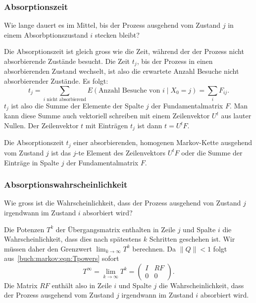 \subsubsection{Absorptionszeit}
%
\begin{frage}
Wie lange dauert es im Mittel, bis der Prozess ausgehend vom Zustand $j$
in einem Absorbptionszustand $i$ stecken bleibt?
\end{frage}
Die Absorptionszeit ist gleich gross wie die Zeit,
während der der Prozess nicht absorbierende
Zustände besucht.
Die Zeit $t_j$, bis der Prozess in einen absorbierenden Zustand wechselt, ist also
die erwartete Anzahl Besuche nicht absorbierender Zustände.
Es folgt:
\[
t_j
=
\sum_{\text{$i$ nicht absorbierend}} E(\text{Anzahl Besuche von $i$}\mid X_0=j)
=
\sum_{i} F_{i\!j}.
\]
$t_j$ ist also die Summe der Elemente der Spalte $j$ der Fundamentalmatrix $F$.
Man kann diese Summe auch vektoriell schreiben mit einem Zeilenvektor $U^t$
aus lauter Nullen.
Der Zeilenvektor $t$ mit Einträgen $t_j$ ist dann
\(
t = U^tF.
\)
\begin{satz}
\label{buch:markov:satz:absorptionszeit}
Die Absorptionszeit $t_j$ einer absorbierenden, homogenen Markov-Kette
ausgehend vom Zustand $j$ ist
das $j$-te Element des Zeilenvektors $U^tF$ oder die Summe der
Einträge in Spalte $j$ der Fundamentalmatrix $F$.
\end{satz}

\subsubsection{Absorptionswahrscheinlichkeit}
%
\begin{frage}
Wie gross ist die Wahrscheinlichkeit, dass der Prozess ausgehend von
Zustand $j$ irgendwann im Zustand $i$ absorbiert wird?
\end{frage}
Die Potenzen $T^k$ der Übergangsmatrix enthalten in Zeile $j$
und Spalte $i$ die Wahrscheinlichkeit, dass dies nach spätestens $k$ Schritten
geschehen ist.
Wir müssen daher den Grenzwert
\(
\lim_{k\to\infty}T^k
\)
berechnen.
Da $\|Q\|<1$ folgt aus~\eqref{buch:markov:eqn:Tpowers} sofort
\[
T^\infty
=
\lim_{k\to\infty}T^k
=
\left(
\begin{array}{cc}
I&RF\\
0&0
\end{array}
\right).
\]
Die Matrix $RF$ enthält also in Zeile $i$ und Spalte $j$
die Wahrscheinlichkeit, dass der Prozess ausgehend vom Zustand $j$
irgendwann im Zustand $i$ absorbiert wird.


